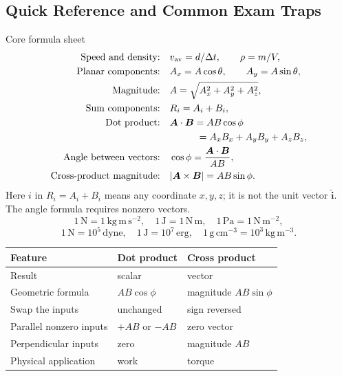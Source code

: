 \documentclass[11pt,letterpaper]{article}
\newcommand{\vect}[1]{\boldsymbol{#1}}
\newcommand{\uv}[1]{\hat{\boldsymbol{#1}}}
\newcommand{\unit}[1]{\,\mathrm{#1}}
\begin{document}
\subsection*{Quick Reference and Common Exam Traps}
\begin{rulebox}{Core formula sheet}
\begin{align*}
 \text{Speed and density:}\quad &v_{\rm av}=d/\Delta t,\qquad\rho=m/V,\\
 \text{Planar components:}\quad&A_x=A\cos\theta,\qquad A_y=A\sin\theta,\\
 \text{Magnitude:}\quad&A=\sqrt{A_x^2+A_y^2+A_z^2},\\
 \text{Sum components:}\quad&R_i=A_i+B_i,\\
 \text{Dot product:}\quad&\vect A\cdot\vect B=AB\cos\phi\\
 &\hspace{2.8em}=A_xB_x+A_yB_y+A_zB_z,\\
 \text{Angle between vectors:}\quad&\cos\phi=\frac{\vect A\cdot\vect B}{AB},\\
 \text{Cross-product magnitude:}\quad&|\vect A\times\vect B|=AB\sin\phi.
\end{align*}
Here $i$ in $R_i=A_i+B_i$ means any coordinate $x,y,z$; it is not the unit vector $\uv i$. The angle formula requires nonzero vectors.
\[
 1\unit{N}=1\unit{kg\,m\,s^{-2}},\quad
 1\unit{J}=1\unit{N\,m},\quad1\unit{Pa}=1\unit{N\,m^{-2}},
\]
\[
 1\unit{N}=10^5\unit{dyne},\quad
 1\unit{J}=10^7\unit{erg},\quad
 1\unit{g\,cm^{-3}}=10^3\unit{kg\,m^{-3}}.
\]
\end{rulebox}

\begin{center}
\begin{tabular}{lll}
\toprule
\textbf{Feature} & \textbf{Dot product} & \textbf{Cross product}\\
\midrule
Result & scalar & vector\\
Geometric formula & $AB\cos\phi$ & magnitude $AB\sin\phi$\\
Swap the inputs & unchanged & sign reversed\\
Parallel nonzero inputs & $+AB$ or $-AB$ & zero vector\\
Perpendicular inputs & zero & magnitude $AB$\\
Physical application & work & torque\\
\bottomrule
\end{tabular}
\end{center}
\end{document}
